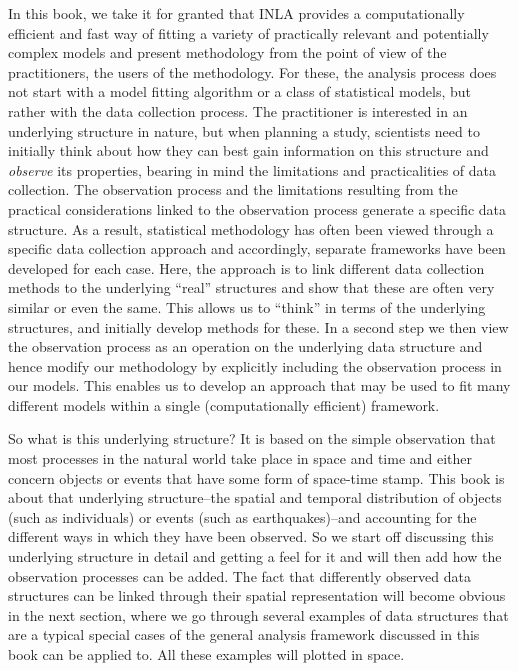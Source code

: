In this book, we take it for granted that INLA provides a computationally efficient and fast way of fitting a variety of practically relevant and potentially complex models and present methodology from the point of view of the practitioners, the users of the methodology. For these, the analysis process does not start with a model fitting algorithm or a class of statistical models, but rather with the data collection process.  The practitioner is interested in an underlying structure in nature, but when planning a study, scientists need to initially think about how they can best gain information on this structure and \textit{observe} its properties, bearing in mind the limitations and practicalities of data collection. The observation process and the limitations resulting from the practical considerations linked to the observation process generate a specific data structure. As a result, statistical methodology has often been  viewed through a specific data collection approach and accordingly, separate frameworks have been developed for each case. Here, the approach is to link different data collection methods to the underlying ``real'' structures and show that these are often very similar or even the same. This allows us to ``think'' in terms of the underlying structures, and initially develop methods for these. In a second step we then view the observation process as an operation on the underlying data structure and hence modify our methodology by explicitly including the observation process in our models. This enables us to develop an approach that may be used to fit many different models within a single (computationally efficient) framework. 

So what is this underlying structure? It is based on the simple observation that most processes in the natural world take place in space and time and either concern objects or events that have some form of space-time stamp. This book is about that underlying structure--the spatial and temporal distribution of objects (such as individuals) or events (such as earthquakes)--and accounting for the different ways in which they have been observed. So we start off discussing this underlying structure in detail and getting a feel for it and will then add how the observation processes can be added. The fact that differently observed  data structures can be linked through their spatial representation
will become obvious in the next section, where we go through several examples of data structures that are a typical special cases of the general analysis framework discussed in this book can be applied to. All these examples will plotted in space.

